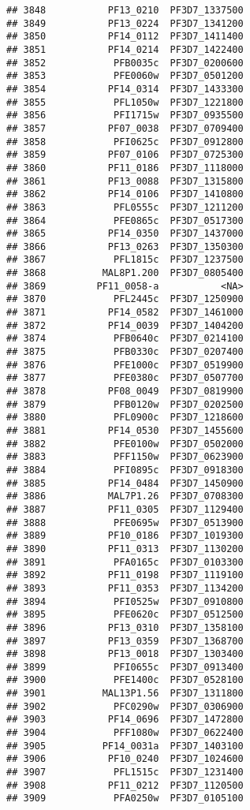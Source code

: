 \documentclass{article}\usepackage[]{graphicx}\usepackage[]{color}
\makeatletter
\newenvironment{kframe}{%
 \def\at@end@of@kframe{}%
 \ifinner\ifhmode%
  \def\at@end@of@kframe{\end{minipage}}%
  \begin{minipage}{\columnwidth}%
 \fi\fi%
 \def\FrameCommand##1{\hskip\@totalleftmargin \hskip-\fboxsep
 \colorbox{shadecolor}{##1}\hskip-\fboxsep
     \hskip-\linewidth \hskip-\@totalleftmargin \hskip\columnwidth}%
 \MakeFramed {\advance\hsize-\width
   \@totalleftmargin\z@ \linewidth\hsize
   \@setminipage}}%
 {\par\unskip\endMakeFramed%
 \at@end@of@kframe}
\newenvironment{knitrout}{}{} %
\makeatother
\begin{document}
\begin{knitrout}
\begin{kframe}
\begin{verbatim}
## 3848           PF13_0210  PF3D7_1337500
## 3849           PF13_0224  PF3D7_1341200
## 3850           PF14_0112  PF3D7_1411400
## 3851           PF14_0214  PF3D7_1422400
## 3852            PFB0035c  PF3D7_0200600
## 3853            PFE0060w  PF3D7_0501200
## 3854           PF14_0314  PF3D7_1433300
## 3855            PFL1050w  PF3D7_1221800
## 3856            PFI1715w  PF3D7_0935500
## 3857           PF07_0038  PF3D7_0709400
## 3858            PFI0625c  PF3D7_0912800
## 3859           PF07_0106  PF3D7_0725300
## 3860           PF11_0186  PF3D7_1118000
## 3861           PF13_0088  PF3D7_1315800
## 3862           PF14_0106  PF3D7_1410800
## 3863            PFL0555c  PF3D7_1211200
## 3864            PFE0865c  PF3D7_0517300
## 3865           PF14_0350  PF3D7_1437000
## 3866           PF13_0263  PF3D7_1350300
## 3867            PFL1815c  PF3D7_1237500
## 3868          MAL8P1.200  PF3D7_0805400
## 3869         PF11_0058-a           <NA>
## 3870            PFL2445c  PF3D7_1250900
## 3871           PF14_0582  PF3D7_1461000
## 3872           PF14_0039  PF3D7_1404200
## 3874            PFB0640c  PF3D7_0214100
## 3875            PFB0330c  PF3D7_0207400
## 3876            PFE1000c  PF3D7_0519900
## 3877            PFE0380c  PF3D7_0507700
## 3878           PF08_0049  PF3D7_0819900
## 3879            PFB0120w  PF3D7_0202500
## 3880            PFL0900c  PF3D7_1218600
## 3881           PF14_0530  PF3D7_1455600
## 3882            PFE0100w  PF3D7_0502000
## 3883            PFF1150w  PF3D7_0623900
## 3884            PFI0895c  PF3D7_0918300
## 3885           PF14_0484  PF3D7_1450900
## 3886           MAL7P1.26  PF3D7_0708300
## 3887           PF11_0305  PF3D7_1129400
## 3888            PFE0695w  PF3D7_0513900
## 3889           PF10_0186  PF3D7_1019300
## 3890           PF11_0313  PF3D7_1130200
## 3891            PFA0165c  PF3D7_0103300
## 3892           PF11_0198  PF3D7_1119100
## 3893           PF11_0353  PF3D7_1134200
## 3894            PFI0525w  PF3D7_0910800
## 3895            PFE0620c  PF3D7_0512500
## 3896           PF13_0310  PF3D7_1358100
## 3897           PF13_0359  PF3D7_1368700
## 3898           PF13_0018  PF3D7_1303400
## 3899            PFI0655c  PF3D7_0913400
## 3900            PFE1400c  PF3D7_0528100
## 3901          MAL13P1.56  PF3D7_1311800
## 3902            PFC0290w  PF3D7_0306900
## 3903           PF14_0696  PF3D7_1472800
## 3904            PFF1080w  PF3D7_0622400
## 3905          PF14_0031a  PF3D7_1403100
## 3906           PF10_0240  PF3D7_1024600
## 3907            PFL1515c  PF3D7_1231400
## 3908           PF11_0212  PF3D7_1120500
## 3909            PFA0250w  PF3D7_0105100

\end{verbatim}
\end{kframe}
\end{knitrout}
\end{document}
